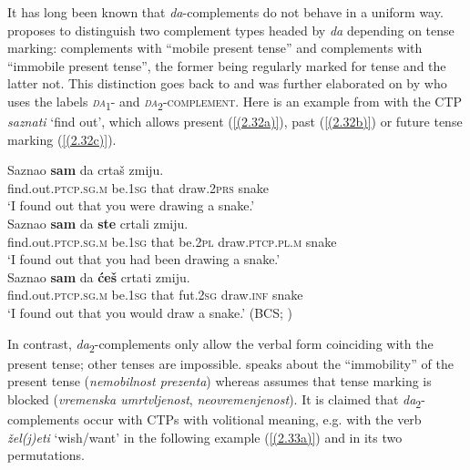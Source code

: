 \noindent It has long been known that \textit{da}-complements do not behave in a uniform way. \citet{Ivic70} proposes to distinguish two complement types headed by \textit{da} depending on tense marking: complements with ``mobile present tense'' and complements with ``immobile present tense'', the former being regularly marked for tense and the latter not. This distinction goes back to \citet{Golab64} and was further elaborated on by \citet[and earlier]{Browne03} who uses the labels \textsc{\textit{da}\textsubscript{1}-} and \textsc{\textit{da}\textsubscript{2}-complement}. Here is an example from \citet[39]{Browne03} with the CTP \textit{saznati} `find out', which allows present (\ref{(2.32a)}), past (\ref{(2.32b)}) or future tense marking (\ref{(2.32c)}).

\begin{exe}\ex
\begin{xlist}
\ex\label{(2.32a)}
\gll Saznao \textbf{sam} da crtaš zmiju. \\
 find.out\textsc{.ptcp.sg.m} be\textsc{.1sg} that draw\textsc{.2prs} snake\\
 \glt ‘I found out that you were drawing a snake.’\\
\ex\label{(2.32b)}
\gll Saznao \textbf{sam} da \textbf{ste} crtali zmiju.\\
  find.out\textsc{.ptcp.sg.m} be\textsc{.1sg} that be\textsc{.2pl} draw\textsc{.ptcp.pl.m} snake\\
  \glt ‘I found out that you had been drawing a snake.’\\
\ex\label{(2.32c)}
\gll Saznao \textbf{sam} da \textbf{ćeš} crtati zmiju.\\
  find.out\textsc{.ptcp.sg.m} be\textsc{.1sg} that fut\textsc{.2sg} draw\textsc{.inf} snake\\
  \glt ‘I found out that you would draw a snake.’ 
\hfill (BCS; \citealt[39]{Browne03})
\end{xlist}
\end{exe}

\noindent In contrast, \textit{da}\textsubscript{2}-complements only allow the verbal form coinciding with the present tense; other tenses are impossible. \citet{Ivic72} speaks about the ``immobility'' of the present tense (\textit{nemobilnost prezenta}) whereas \citet[119]{Dukanovic94} assumes that tense marking is blocked (\textit{vremenska umrtvljenost}, \textit{neovremenjenost}). It is claimed that \textit{da}\textsubscript{2}-complements occur with CTPs with volitional meaning, e.g. with the verb \textit{žel(j)eti} `wish/want' in the following example (\ref{(2.33a)}) and in its two permutations.

